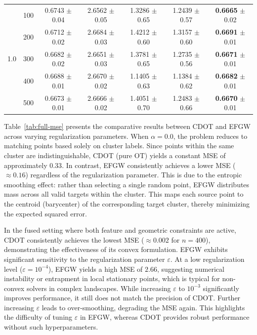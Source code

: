 \documentclass{article}
\theoremstyle{plain}
\theoremstyle{definition}
\theoremstyle{remark}
\begin{document}
\begin{table}[t]
\begin{tabular}{ccccccc}
		\midrule
		\multirow{5}{*}{1.0}
		& 100 & 0.6743 $\pm$ 0.04 & 2.6562    $\pm$ 0.05 & 1.3286 $\pm$ 0.65 & 1.2439 $\pm$ 0.57 & \textbf{0.6665} $\pm$ 0.02 \\
		& 200 & 0.6712 $\pm$ 0.02 & 2.6684 $\pm$ 0.03 & 1.4212 $\pm$ 0.60 & 1.3157 $\pm$ 0.60 & \textbf{0.6691} $\pm$ 0.01 \\
		& 300 & 0.6682 $\pm$ 0.02 & 2.6651 $\pm$ 0.03 & 1.3781 $\pm$ 0.65 & 1.2735 $\pm$ 0.56 & \textbf{0.6671} $\pm$ 0.01 \\
		& 400 & 0.6688 $\pm$ 0.01 & 2.6670 $\pm$ 0.02 & 1.1405 $\pm$ 0.63 & 1.1384 $\pm$ 0.62 & \textbf{0.6682} $\pm$ 0.01 \\
		& 500 & 0.6673 $\pm$ 0.01 & 2.6666 $\pm$ 0.02 & 1.4051 $\pm$ 0.70 & 1.2483 $\pm$ 0.66 & \textbf{0.6670} $\pm$ 0.01 \\
		\bottomrule
	\end{tabular}
\end{table}

Table~\ref{tab:full-mse} presents the comparative results between CDOT and EFGW across varying regularization parameters. When $\alpha = 0.0$, the problem reduces to matching points based solely on cluster labels. Since points within the same cluster are indistinguishable, CDOT (pure OT) yields a constant MSE of approximately $0.33$. In contrast, EFGW consistently achieves a lower MSE ($\approx 0.16$) regardless of the regularization parameter. This is due to the entropic smoothing effect: rather than selecting a single random point, EFGW distributes mass across all valid targets within the cluster. This maps each source point to the centroid (barycenter) of the corresponding target cluster, thereby minimizing the expected squared error.

In the fused setting where both feature and geometric constraints are active, CDOT consistently achieves the lowest MSE ($\approx 0.002$ for $n=400$), demonstrating the effectiveness of its convex formulation. EFGW exhibits significant sensitivity to the regularization parameter $\varepsilon$. At a low regularization level ($\varepsilon=10^{-4}$), EFGW yields a high MSE of $2.66$, suggesting numerical instability or entrapment in local stationary points, which is typical for non-convex solvers in complex landscapes. While increasing $\varepsilon$ to $10^{-3}$ significantly improves performance, it still does not match the precision of CDOT. Further increasing $\varepsilon$ leads to over-smoothing, degrading the MSE again. This highlights the difficulty of tuning $\varepsilon$ in EFGW, whereas CDOT provides robust performance without such hyperparameters.
\end{document}
